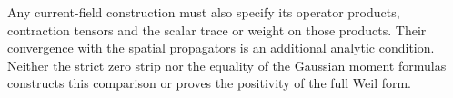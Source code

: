 Any current-field construction must also specify its operator products,
contraction tensors and the scalar trace or weight on those products.
Their convergence with the spatial propagators is an additional analytic
condition.  Neither the strict zero strip nor the equality of the
Gaussian moment formulas constructs this comparison or proves the
positivity of the full Weil form.
